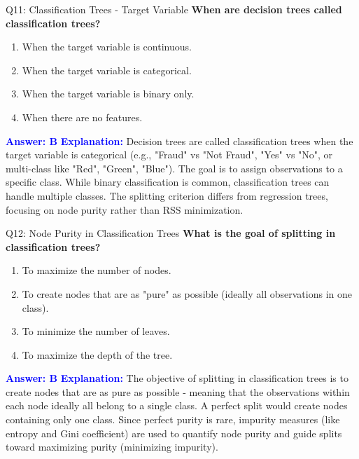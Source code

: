 \documentclass[8pt]{beamer}
\begin{document}
	\begin{frame}{Q11: Classification Trees - Target Variable}
		\fontsize{6.5}{7.5}\selectfont
		\textbf{When are decision trees called classification trees?}
		\begin{enumerate}
			\item When the target variable is continuous.
			\item When the target variable is categorical.
			\item When the target variable is binary only.
			\item When there are no features.
		\end{enumerate}
		\vspace{0.1cm}
		\textcolor{blue}{\textbf{Answer: B}}
		\vspace{0.1cm}
		\textcolor{blue}{\textbf{Explanation:}} Decision trees are called classification trees when the target variable is categorical (e.g., "Fraud" vs "Not Fraud", "Yes" vs "No", or multi-class like "Red", "Green", "Blue"). The goal is to assign observations to a specific class. While binary classification is common, classification trees can handle multiple classes. The splitting criterion differs from regression trees, focusing on node purity rather than RSS minimization.
	\end{frame}
	
	\begin{frame}{Q12: Node Purity in Classification Trees}
		\fontsize{6.5}{7.5}\selectfont
		\textbf{What is the goal of splitting in classification trees?}
		\begin{enumerate}
			\item To maximize the number of nodes.
			\item To create nodes that are as "pure" as possible (ideally all observations in one class).
			\item To minimize the number of leaves.
			\item To maximize the depth of the tree.
		\end{enumerate}
		\vspace{0.1cm}
		\textcolor{blue}{\textbf{Answer: B}}
		\vspace{0.1cm}
		\textcolor{blue}{\textbf{Explanation:}} The objective of splitting in classification trees is to create nodes that are as pure as possible - meaning that the observations within each node ideally all belong to a single class. A perfect split would create nodes containing only one class. Since perfect purity is rare, impurity measures (like entropy and Gini coefficient) are used to quantify node purity and guide splits toward maximizing purity (minimizing impurity).
	\end{frame}
	
\end{document}
